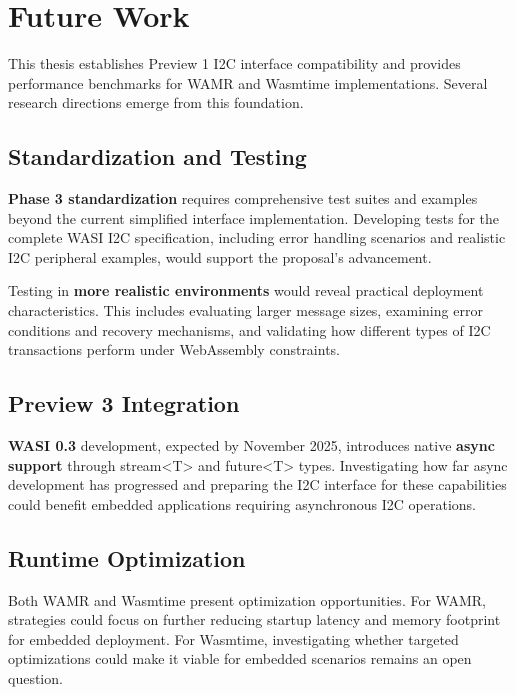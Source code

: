 \chapter*{Future Work}
\label{chap:future-work}



This thesis establishes Preview 1 I2C interface compatibility and provides performance benchmarks for WAMR and Wasmtime implementations. Several research directions emerge from this foundation.

\section*{Standardization and Testing}
\label{sec:standardization-testing}

\textbf{Phase 3 standardization} requires comprehensive test suites and examples beyond the current simplified interface implementation. Developing tests for the complete WASI I2C specification, including error handling scenarios and realistic I2C peripheral examples, would support the proposal's advancement.

Testing in \textbf{more realistic environments} would reveal practical deployment characteristics. This includes evaluating larger message sizes, examining error conditions and recovery mechanisms, and validating how different types of I2C transactions perform under WebAssembly constraints.

\section*{Preview 3 Integration}
\label{sec:preview3-integration}

\textbf{WASI 0.3} development, expected by November 2025, introduces native \textbf{async support} through stream<T> and future<T> types. Investigating how far async development has progressed and preparing the I2C interface for these capabilities could benefit embedded applications requiring asynchronous I2C operations.

\section*{Runtime Optimization}
\label{sec:runtime-optimization}

Both WAMR and Wasmtime present optimization opportunities. For WAMR, strategies could focus on further reducing startup latency and memory footprint for embedded deployment. For Wasmtime, investigating whether targeted optimizations could make it viable for embedded scenarios remains an open question.

